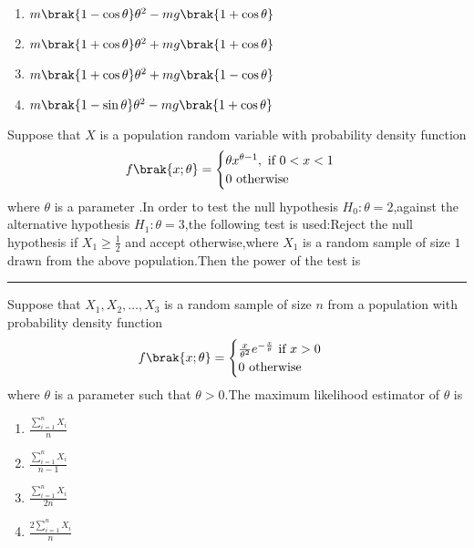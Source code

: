        \begin{enumerate}
           \item $m\brak{1-\cos\theta}\theta^{2} - mg\brak{1+\cos\theta} $
           \item $m\brak{1+\cos\theta}\theta^{2} + mg\brak{1+\cos\theta} $
           \item $m\brak{1+\cos\theta}\theta^{2} + mg\brak{1-\cos\theta} $
           \item $m\brak{1-\sin\theta}\theta^{2} - mg\brak{1+\cos\theta} $\\
       \end{enumerate}
       \item Suppose that $X$ is a population random variable with probability density function
       \begin{align}
           f\brak{x;\theta} = \begin{cases} \theta x^{\theta-1} , \text{ if } 0<x<1 \\ 0 \text{ otherwise } \end{cases}
       \end{align}
       where $\theta$ is a parameter .In order to test the null hypothesis $H_0 \colon \theta = 2$,against the alternative hypothesis $H_1 \colon \theta = 3$,the following test is used:Reject the null hypothesis if $X_1 \geq \frac{1}{2}$ and accept otherwise,where $X_1$ is a random sample of size $1$ drawn from the above population.Then the power of the test is \rule{3cm}{0.15 mm}
       \item Suppose that $X_1,X_2,\dots,X_3$ is a random sample of size $n$ from a population with probability density function
       \begin{align}
           f\brak{x;\theta} = \begin{cases}
               \frac{x}{\theta^2}e^{-\frac{x}{\theta}} \text{ if } x>0 \\ 0 \text{ otherwise }
           \end{cases}
       \end{align}
       where $\theta$ is a parameter such that $\theta > 0$.The maximum likelihood estimator of $\theta $ is
       \begin{multicols}{2}
       \begin{enumerate}
           \item $\frac{\sum_{i=1}^{n} X_i}{n}$\\
            \item $\frac{\sum_{i=1}^{n} X_i}{n-1}$
             \item $\frac{\sum_{i=1}^{n} X_i}{2n}$\\
              \item $\frac{2\sum_{i=1}^{n} X_i}{n}$
       \end{enumerate}
       \end{multicols}
